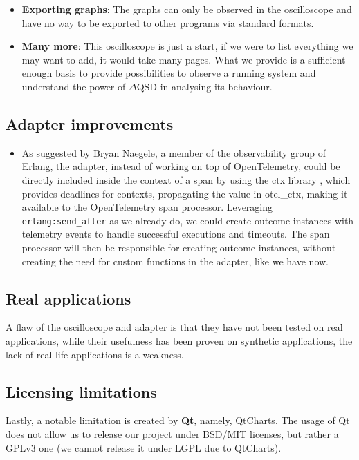 \begin{itemize}
                \item \textbf{Exporting graphs}: The graphs can only be observed in the oscilloscope and have no way to be exported to other programs via standard formats.

                \item \textbf{Many more}: This oscilloscope is just a start, if we were to list everything we may want to add, it would take many pages. What we provide is a sufficient enough basis to provide possibilities to observe a running system and understand the power of $\Delta$QSD in analysing its behaviour.
           \end{itemize} 
                
      \subsection{Adapter improvements}

        \begin{itemize}
            \item As suggested by Bryan Naegele, a member of the observability group of Erlang, the adapter, instead of working on top of OpenTelemetry, could be directly included inside the context of a span by using the ctx library \cite{ctx}, which provides deadlines for contexts, propagating the value in otel\_ctx, making it available to the OpenTelemetry span processor. Leveraging \texttt{erlang:send\_after} as we already do, we could create outcome instances with telemetry events to handle successful executions and timeouts. The span processor will then be responsible for creating outcome instances, without creating the need for custom functions in the adapter, like we have now.
        \end{itemize}
   
    \subsection{Real applications}
        A flaw of the oscilloscope and adapter is that they have not been tested on real applications, while their usefulness has been proven on synthetic applications, the lack of real life applications is a weakness.

    \subsection{Licensing limitations}
    Lastly, a notable limitation is created by \textbf{Qt}, namely, QtCharts. The usage of Qt does not allow us to release our project under BSD/MIT licenses, but rather a GPLv3 one (we cannot release it under LGPL due to QtCharts). \cite{qt-gpl}
